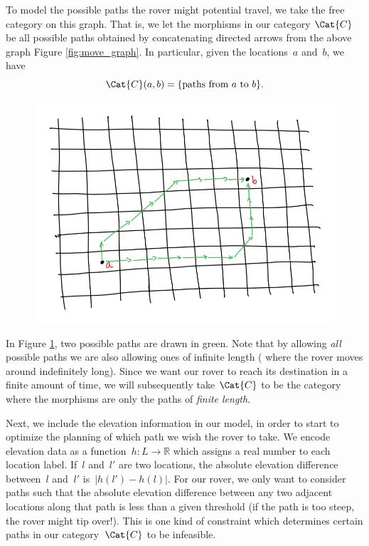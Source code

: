 {To model the possible paths the rover might potential travel, we take the free category on this graph. That is, we let the morphisms in our category $\Cat{C}$ be all possible paths obtained by concatenating directed arrows from the above graph Figure \ref{fig:move_graph}. In particular, given the locations~$a$ and~$b$, we have 
\begin{equation}
\Cat{C}(a, b) = \{ \text{paths from } a \text{ to } b \}.
\end{equation}

\begin{figure}[h!]
\centering
 \includegraphics[width=0.5\linewidth]{pics/path_planning_3.png}
 \caption{}
\label{fig:rover_paths}
\end{figure}

In Figure \ref{fig:rover_paths}, two possible paths are drawn in green. Note that by allowing \emph{all} possible paths we are also allowing ones of infinite length ( where the rover moves around indefinitely long). Since we want our rover to reach its destination in a finite amount of time, we will subsequently take $\Cat{C}$ to be the category where the morphisms are only the paths of \emph{finite length}. 

Next, we include the elevation information in our model, in order to start to optimize the planning of which path we wish the rover to take. We encode elevation data as a function~$h \colon L \to \mathbb{R}$ which assigns a real number to each location label. If~$l$ and~$l'$ are two locations, the absolute elevation difference between~$l$ and $~l'$ is~$\vert h(l') - h(l) \vert$. For our rover, we only want to consider paths such that the absolute elevation difference between any two adjacent locations along that path is less than a given threshold (if the path is too steep, the rover might tip over!). This is one kind of constraint which determines certain paths in our category~$\Cat{C}$ to be infeasible. 

}
